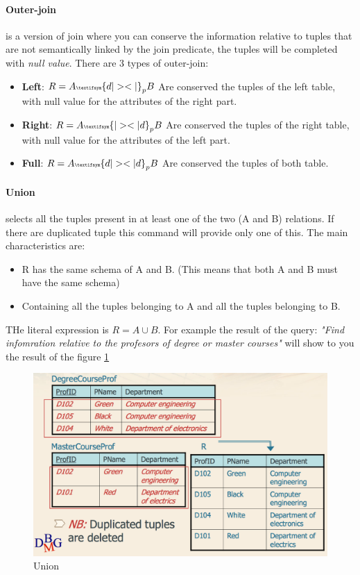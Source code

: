 \documentclass[12pt]{article}
\begin{document}
\paragraph{Outer-join} is a version of join where you can conserve the information relative to tuples that are not semantically linked by the join predicate, the tuples will be completed with \textit{null value}. There are 3 types of outer-join:
\begin{itemize}
  \item \textbf{Left}: $R=A {\tiny \textifsym{d|><|}}_{p} B$ Are conserved the tuples of the left table, with null value for the attributes of the right part.
  \item \textbf{Right}: $R=A {\tiny \textifsym{|><|d}}_{p} B$ Are conserved the tuples of the right table, with null value for the attributes of the left part.
  \item \textbf{Full}: $R=A {\tiny \textifsym{d|><|d}}_{p} B$ Are conserved the tuples of both table.
\end{itemize}

\paragraph{Union} selects all the tuples present in at least one of the two (A and B) relations. If there are duplicated tuple this command will provide only one of this. The main characteristics are:
\begin{itemize}
  \item R has the same schema of A and B. (This means that both A and B must have the same schema)
  \item Containing all the tuples belonging to A and all the tuples belonging to B.
\end{itemize}
THe literal expression is $R=A \cup B$. For example the result of the query: \textit{"Find infomration relative to the profesors of degree or master courses"} will show to you the result of the figure \ref{fig:union}
\begin{figure}[H]
  \includegraphics[width=\textwidth]{images/union.png}
  \caption{Union}
  \label{fig:union}
\end{figure}
\end{document}
